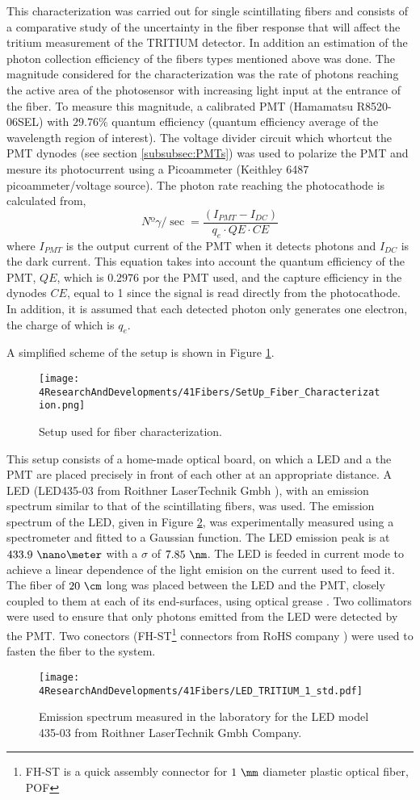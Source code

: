 This characterization was carried out for single scintillating fibers and consists of a comparative study of the uncertainty in the fiber response that will affect the tritium measurement of the TRITIUM detector. In addition an estimation of the photon collection efficiency of the fibers types mentioned above was done. The magnitude considered for the characterization was the rate of photons reaching the active area of the photosensor with increasing light input at the entrance of the fiber. To measure this magnitude, a calibrated PMT (Hamamatsu R8520-06SEL) with $29.76\%$ quantum efficiency (quantum efficiency average of the wavelength region of interest). The voltage divider circuit which whortcut the PMT dynodes (see section \ref{subsubsec:PMTs}) was used to polarize the PMT  and mesure its photocurrent using a Picoammeter (Keithley 6487 picoammeter/voltage source). The photon rate reaching the photocathode is calculated from,
\begin{equation}
Nº\gamma/\sec = \frac{\left( I_{PMT} - I_{DC} \right)}{q_e \cdot{} QE \cdot{} CE}
\label{eq:NumPhotonsFromIntensityPMT}
\end{equation}
where $I_{PMT}$ is the output current of the PMT when it detects photons and $I_{DC}$ is the dark current. This equation takes into account the quantum efficiency of the PMT, $QE$, which is $0.2976$ por the PMT used, and the capture efficiency in the dynodes $CE$, equal to 1 since the signal is read directly from the photocathode. In addition, it is assumed that each detected photon only generates one electron, the charge of which is $q_e$. 

A simplified scheme of the setup is shown in Figure \ref{fig:SetUpFiberCharacterization}.

\begin{figure}[h]
\centering
\texttt{[image: 4ResearchAndDevelopments/41Fibers/SetUp\_Fiber\_Characterization.png]}
\caption{Setup used for fiber characterization.\label{fig:SetUpFiberCharacterization}}
\end{figure}

This setup consists of a home-made optical board, on which a LED and a the PMT are placed precisely in front of each other at an appropriate distance. A LED (LED435-03 from Roithner LaserTechnik Gmbh \cite{LEDRLT}), with an emission spectrum similar to that of the scintillating fibers, was used. The emission spectrum of the LED, given in Figure \ref{fig:LEDSpectrumTritium}, was experimentally measured using a spectrometer and fitted to a Gaussian function. The LED emission peak is at $433.9~\nano\meter$ with a $\sigma$ of $7.85~\nm$. The LED is feeded in current mode to achieve a linear dependence of the light emision on the current used to feed it. The fiber of $20~\cm$ long was placed between the LED and the PMT, closely coupled to them at each of its end-surfaces, using optical grease \cite{OpticalGrease}. Two collimators were used to ensure that only photons emitted from the LED were detected by the PMT. Two conectors (FH-ST\footnote{FH-ST is a quick assembly connector for $1~\mm$ diameter plastic optical fiber, POF} connectors from RoHS company \cite{}) were used to fasten the fiber to the system. 

\begin{figure}[h]
\centering
\texttt{[image: 4ResearchAndDevelopments/41Fibers/LED\_TRITIUM\_1\_std.pdf]}
\caption{Emission spectrum measured in the laboratory for the LED model 435-03 from Roithner LaserTechnik Gmbh Company.\label{fig:LEDSpectrumTritium}}
\end{figure}
